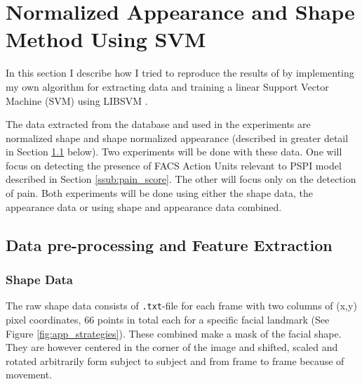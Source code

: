 \documentclass[Main]{subfiles}
\begin{document}
\section{Normalized Appearance and Shape Method Using SVM} %
	\label{sec:normalized_appearance_and_shape_method_using_svm}
	In this section I describe how I tried to reproduce the results of \cite{Lucey2011} by implementing my own algorithm for extracting data and training a linear Support Vector Machine (SVM) using LIBSVM \cite{CC01a}.

	The data extracted from the database and used in the experiments are normalized shape and shape normalized appearance (described in greater detail in Section \ref{sub:data_pre_processing_and_feature_extraction} below).
	Two experiments will be done with these data.
	One will focus on detecting the presence of FACS Action Units relevant to PSPI model described in Section \ref{ssub:pain_score}.
	The other will focus only on the detection of pain.
	Both experiments will be done using either the shape data, the appearance data or using shape and appearance data combined.



		

	\subsection{Data pre-processing and Feature Extraction} %
		\label{sub:data_pre_processing_and_feature_extraction}

		\subsubsection{Shape Data} %
			\label{ssub:shape_data}
			The raw shape data consists of \texttt{.txt}-file for each frame with two columns of (x,y) pixel coordinates, 66 points in total each for a specific facial landmark
			(See Figure \ref{fig:app_strategies}).
			These combined make a mask of the facial shape.
			They are however centered in the corner of the image and shifted, scaled and rotated arbitrarily form subject to subject and from frame to frame because of movement.
\end{document}
